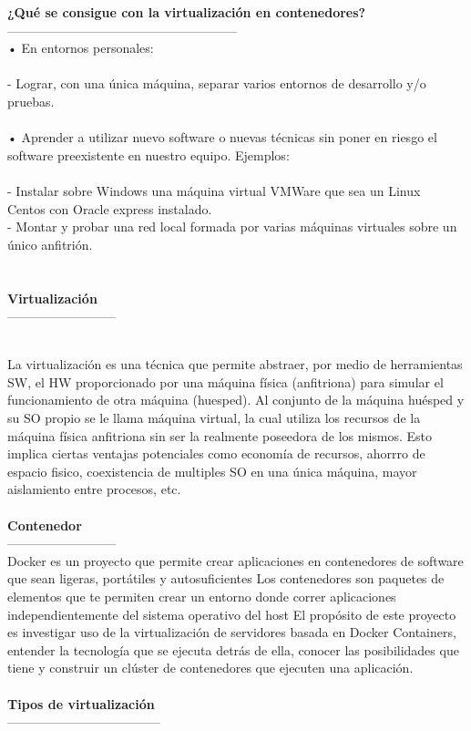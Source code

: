 \documentclass[twoside,twocolumn]{article}
\begin{document}
\begin{flushright}
\begin{itemize}
\textbf{¿Qué se consigue con la virtualización en contenedores?}\\
------------------------------------------------------
\textbf{}\\
• En entornos personales:
\textbf{}\\
\textbf{}\\
- Lograr, con una única máquina, separar varios entornos de
desarrollo y/o pruebas.
\textbf{}\\
\textbf{}\\
• Aprender a utilizar nuevo software o nuevas técnicas sin poner en
riesgo el software preexistente en nuestro equipo. Ejemplos:
\textbf{}\\
\textbf{}\\
- Instalar sobre Windows una máquina virtual VMWare que sea un Linux\textbf{}\\
Centos con Oracle express instalado.
\textbf{}\\
- Montar y probar una red local formada por varias máquinas virtuales
sobre un único anfitrión.
\textbf{}\\
\textbf{}\\
\textbf{}\\
\textbf{Virtualización}\\
--------------------------

\textbf{}\\
La virtualización es una técnica que permite abstraer, por medio de herramientas SW, el
HW proporcionado por una máquina física (anfitriona) para simular el funcionamiento de otra
máquina (huesped). Al conjunto de la máquina huésped y su SO propio se le llama máquina
virtual, la cual utiliza los recursos de la máquina física anfitriona sin ser la realmente poseedora
de los mismos. Esto implica ciertas ventajas potenciales como economía de recursos, ahorrro
de espacio fisico, coexistencia de multiples SO en una única máquina, mayor aislamiento entre
procesos, etc.
\textbf{}\\

\textbf{}\\
\textbf{Contenedor}\\

--------------------------
\textbf{}\\
Docker es un proyecto que permite crear aplicaciones en contenedores de software
que sean ligeras, portátiles y autosuficientes Los contenedores son paquetes de elementos
que te permiten crear un entorno donde correr aplicaciones independientemente del sistema
operativo del host El propósito de este proyecto es investigar uso de la virtualización
de servidores basada en Docker Containers, entender la tecnología que se ejecuta detrás de ella, 
conocer las posibilidades que tiene y construir un clúster de contenedores que ejecuten una aplicación.
\textbf{}\\
\textbf{}\\
\textbf{Tipos de virtualización}\\
------------------------------------



\end{itemize}
\end{flushright}
\end{document}
